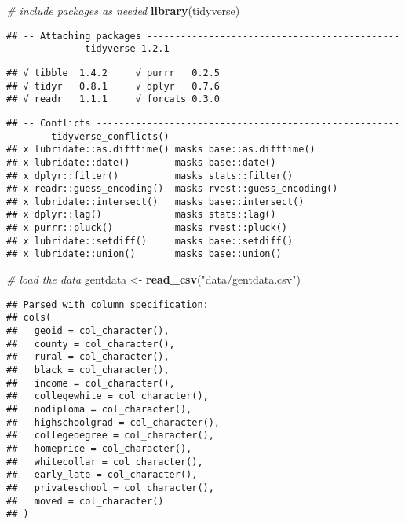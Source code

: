 \documentclass[]{article}
\title{}
\subtitle{Project Proposal}
\author{Apache Junction Armchairs: Ellie, Ryan, Sude, Darren}
\date{2/27/2020}
\newenvironment{Shaded}{\begin{snugshade}}{\end{snugshade}}
\newcommand{\CommentTok}[1]{\textcolor[rgb]{0.56,0.35,0.01}{\textit{#1}}}
\newcommand{\KeywordTok}[1]{\textcolor[rgb]{0.13,0.29,0.53}{\textbf{#1}}}
\newcommand{\NormalTok}[1]{#1}
\newcommand{\StringTok}[1]{\textcolor[rgb]{0.31,0.60,0.02}{#1}}
\begin{document}
\begin{Shaded}
\begin{Highlighting}[]
\CommentTok{# include packages as needed}
\KeywordTok{library}\NormalTok{(tidyverse)}
\end{Highlighting}
\end{Shaded}

\begin{verbatim}
## -- Attaching packages ---------------------------------------------------------- tidyverse 1.2.1 --
\end{verbatim}

\begin{verbatim}
## √ tibble  1.4.2     √ purrr   0.2.5
## √ tidyr   0.8.1     √ dplyr   0.7.6
## √ readr   1.1.1     √ forcats 0.3.0
\end{verbatim}

\begin{verbatim}
## -- Conflicts ------------------------------------------------------------- tidyverse_conflicts() --
## x lubridate::as.difftime() masks base::as.difftime()
## x lubridate::date()        masks base::date()
## x dplyr::filter()          masks stats::filter()
## x readr::guess_encoding()  masks rvest::guess_encoding()
## x lubridate::intersect()   masks base::intersect()
## x dplyr::lag()             masks stats::lag()
## x purrr::pluck()           masks rvest::pluck()
## x lubridate::setdiff()     masks base::setdiff()
## x lubridate::union()       masks base::union()
\end{verbatim}

\begin{Shaded}
\begin{Highlighting}[]
\CommentTok{# load the data}
\NormalTok{gentdata <-}\StringTok{ }\KeywordTok{read_csv}\NormalTok{(}\StringTok{"data/gentdata.csv"}\NormalTok{)}
\end{Highlighting}
\end{Shaded}

\begin{verbatim}
## Parsed with column specification:
## cols(
##   geoid = col_character(),
##   county = col_character(),
##   rural = col_character(),
##   black = col_character(),
##   income = col_character(),
##   collegewhite = col_character(),
##   nodiploma = col_character(),
##   highschoolgrad = col_character(),
##   collegedegree = col_character(),
##   homeprice = col_character(),
##   whitecollar = col_character(),
##   early_late = col_character(),
##   privateschool = col_character(),
##   moved = col_character()
## )
\end{verbatim}
\end{document}
